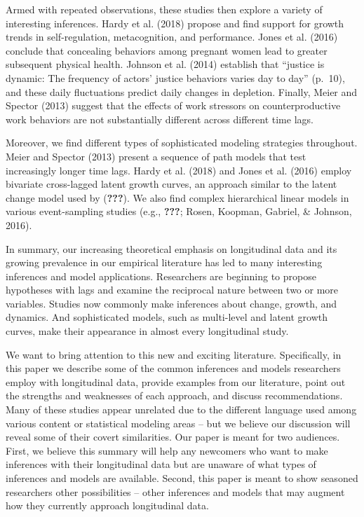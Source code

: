 \documentclass[english,,man]{apa6}
\theoremstyle{definition}
\theoremstyle{definition}
\theoremstyle{definition}
\theoremstyle{remark}
\begin{document}
Armed with repeated observations, these studies then explore a variety
of interesting inferences. Hardy et al. (2018) propose and find support
for growth trends in self-regulation, metacognition, and performance.
Jones et al. (2016) conclude that concealing behaviors among pregnant
women lead to greater subsequent physical health. Johnson et al. (2014)
establish that \enquote{justice is dynamic: The frequency of actors'
justice behaviors varies day to day} (p.~10), and these daily
fluctuations predict daily changes in depletion. Finally, Meier and
Spector (2013) suggest that the effects of work stressors on
counterproductive work behaviors are not substantially different across
different time lags.

Moreover, we find different types of sophisticated modeling strategies
throughout. Meier and Spector (2013) present a sequence of path models
that test increasingly longer time lags. Hardy et al. (2018) and Jones
et al. (2016) employ bivariate cross-lagged latent growth curves, an
approach similar to the latent change model used by ({\textbf{???}}). We
also find complex hierarchical linear models in various event-sampling
studies (e.g., {\textbf{???}}; Rosen, Koopman, Gabriel, \& Johnson,
2016).

In summary, our increasing theoretical emphasis on longitudinal data and
its growing prevalence in our empirical literature has led to many
interesting inferences and model applications. Researchers are beginning
to propose hypotheses with lags and examine the reciprocal nature
between two or more variables. Studies now commonly make inferences
about change, growth, and dynamics. And sophisticated models, such as
multi-level and latent growth curves, make their appearance in almost
every longitudinal study.

We want to bring attention to this new and exciting literature.
Specifically, in this paper we describe some of the common inferences
and models researchers employ with longitudinal data, provide examples
from our literature, point out the strengths and weaknesses of each
approach, and discuss recommendations. Many of these studies appear
unrelated due to the different language used among various content or
statistical modeling areas -- but we believe our discussion will reveal
some of their covert similarities. Our paper is meant for two audiences.
First, we believe this summary will help any newcomers who want to make
inferences with their longitudinal data but are unaware of what types of
inferences and models are available. Second, this paper is meant to show
seasoned researchers other possibilities -- other inferences and models
that may augment how they currently approach longitudinal data.
\end{document}
